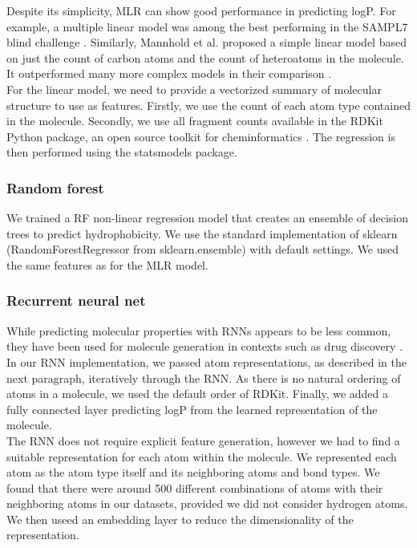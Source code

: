 \documentclass{article}
\begin{document}
Despite its simplicity, MLR can show good performance in predicting logP. For example, a multiple linear model was among the best performing in the SAMPL7 blind challenge \cite{lopez2021multiple}. Similarly, Mannhold et al. proposed a simple linear model based on just the count of carbon atoms and the count of heteroatoms in the molecule. It outperformed many more complex models in their comparison \cite{mannhold2009calculation}.\\

For the linear model, we need to provide a vectorized summary of molecular structure to use as features. Firstly, we use the count of each atom type contained in the molecule. Secondly, we use all fragment counts available in the RDKit Python package, an open source toolkit for cheminformatics \cite{greg_landrum_2022_6961488}. The regression is then performed using the statsmodels package.

\subsubsection{Random forest}

We trained a RF non-linear regression model that creates an ensemble of decision trees to predict hydrophobicity. We use the standard implementation of sklearn (RandomForestRegressor from sklearn.ensemble) with default settings. We used the same features as for the MLR model.

\subsubsection{Recurrent neural net}

While predicting molecular properties with RNNs appears to be less common, they have been used for molecule generation in contexts such as drug discovery \cite{bjerrum2017molecular}. In our RNN implementation, we passed atom representations, as described in the next paragraph, iteratively through the RNN. As there is no natural ordering of atoms in a molecule, we used the default order of RDKit. Finally, we added a fully connected layer predicting logP from the learned representation of the molecule.\\

The RNN does not require explicit feature generation, however we had to find a suitable representation for each atom within the molecule. We represented each atom as the atom type itself and its neighboring atoms and bond types. We found that there were around 500 different combinations of atoms with their neighboring atoms in our datasets, provided we did not consider hydrogen atoms. We then useed an embedding layer to reduce the dimensionality of the representation.\\
\end{document}
